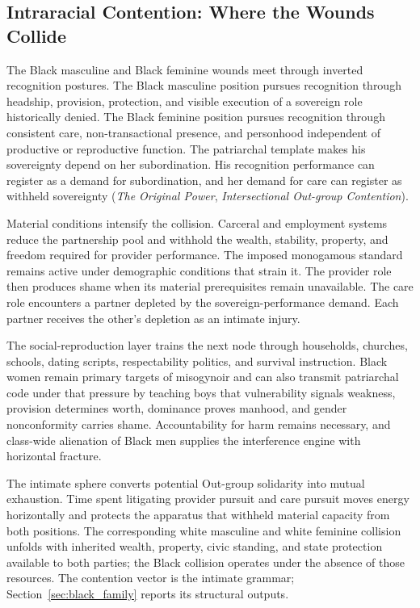 \documentclass[12pt]{article}
\newcommand{\OP}{\textit{The Original Power}}
\begin{document}
\subsection{Intraracial Contention: Where the Wounds Collide}

The Black masculine and Black feminine wounds meet through inverted recognition postures. The Black masculine position pursues recognition through headship, provision, protection, and visible execution of a sovereign role historically denied. The Black feminine position pursues recognition through consistent care, non-transactional presence, and personhood independent of productive or reproductive function. The patriarchal template makes his sovereignty depend on her subordination. His recognition performance can register as a demand for subordination, and her demand for care can register as withheld sovereignty (\OP{}, \textit{Intersectional Out-group Contention}).

Material conditions intensify the collision. Carceral and employment systems reduce the partnership pool and withhold the wealth, stability, property, and freedom required for provider performance. The imposed monogamous standard remains active under demographic conditions that strain it. The provider role then produces shame when its material prerequisites remain unavailable. The care role encounters a partner depleted by the sovereign-performance demand. Each partner receives the other's depletion as an intimate injury.

The social-reproduction layer trains the next node through households, churches, schools, dating scripts, respectability politics, and survival instruction. Black women remain primary targets of misogynoir and can also transmit patriarchal code under that pressure by teaching boys that vulnerability signals weakness, provision determines worth, dominance proves manhood, and gender nonconformity carries shame. Accountability for harm remains necessary, and class-wide alienation of Black men supplies the interference engine with horizontal fracture.

The intimate sphere converts potential Out-group solidarity into mutual exhaustion. Time spent litigating provider pursuit and care pursuit moves energy horizontally and protects the apparatus that withheld material capacity from both positions. The corresponding white masculine and white feminine collision unfolds with inherited wealth, property, civic standing, and state protection available to both parties; the Black collision operates under the absence of those resources. The contention vector is the intimate grammar; Section~\ref{sec:black_family} reports its structural outputs.
\end{document}
